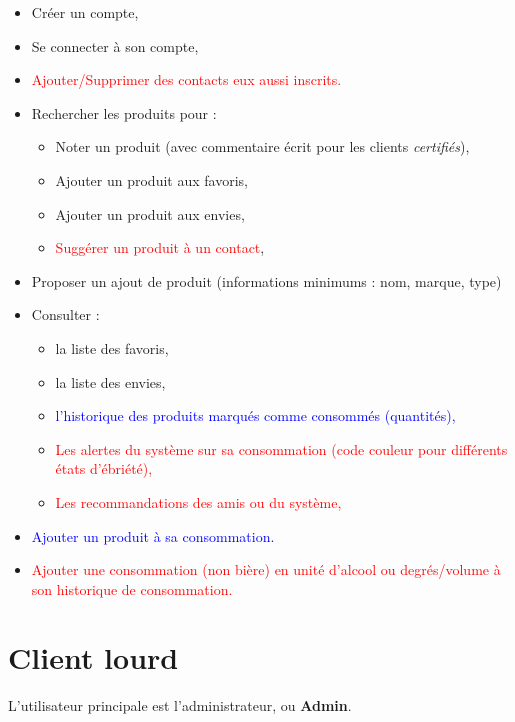 \documentclass[a4paper,12pt,twoside]{article}
\begin{document}
\begin{itemize}
 \item Créer un compte, 
 \item Se connecter à son compte, 
 \item \textcolor{red}{Ajouter/Supprimer des contacts eux aussi inscrits.}
 \item Rechercher les produits pour : 
 	\begin{itemize}
 	 \item Noter un produit (avec commentaire écrit pour les clients \textit{certifiés}),
 	 \item Ajouter un produit aux favoris, 
 	 \item Ajouter un produit aux envies,
 	 \item \textcolor{red}{Suggérer un produit à un contact},
 	\end{itemize}
 \item Proposer un ajout de produit (informations minimums : nom, marque, type)
 \item Consulter : 
 	\begin{itemize}
 	 \item la liste des favoris, 
 	 \item la liste des envies, 
 	 \item \textcolor{blue}{l'historique des produits marqués comme consommés (quantités),} 
 	 \item \textcolor{red}{Les alertes du système sur sa consommation (code couleur pour différents états d'ébriété),}
 	 \item \textcolor{red}{Les recommandations des amis ou du système,}
 	\end{itemize}
 \item \textcolor{blue}{Ajouter un produit à sa consommation.}
 \item \textcolor{red}{Ajouter une consommation (non bière) en unité d'alcool ou degrés/volume à son historique de consommation.}
\end{itemize}

\section{Client lourd}

L'utilisateur principale est l'administrateur, ou \textbf{Admin}. \\
\end{document}
